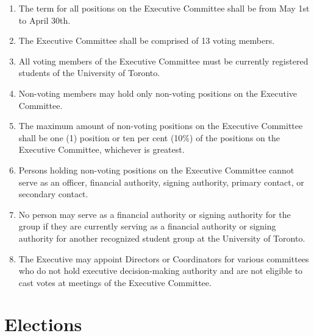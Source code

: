 \documentclass[12pt,a4paper]{article}
\begin{document}
\begin{enumerate}
\item The term for all positions on the Executive Committee shall be from May 1st to April 30th.

\item The Executive Committee shall be comprised of 13 voting members.

\item All voting members of the Executive Committee must be currently registered students of the University of Toronto.

\item Non-voting members may hold only non-voting positions on the Executive Committee.

\item The maximum amount of non-voting positions on the Executive Committee shall be one (1) position or ten per cent (10\%) of the positions on the Executive Committee, whichever is greatest.

\item Persons holding non-voting positions on the Executive Committee cannot serve as an officer, financial authority, signing authority, primary contact, or secondary contact.

\item No person may serve as a financial authority or signing authority for the group if they are currently serving as a financial authority or signing authority for another recognized student group at the University of Toronto.

\item The Executive may appoint Directors or Coordinators for various committees who do not hold executive decision-making authority and are not eligible to cast votes at meetings of the Executive Committee.
\end{enumerate}

\section{Elections}
\end{document}

